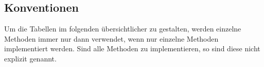 \newcommand{\atable}[3]{\begin{longtable}{llllll}
                            \caption{#2}\label{tab:#1} \\
                            \toprule
                            \textbf{Arbeitspaket} & \textbf{Start} & \textbf{Ende} & \textbf{Aufwand} & \textbf{Bearbeiter:in} & \textbf{Artefakte}
                            \\
                            \midrule
                            \endfirsthead

                            \caption{#2 \emph{(Fortsetzung)}}\\
                            \toprule
                            \textbf{Arbeitspaket} & \textbf{Start} & \textbf{Ende} & \textbf{Aufwand} & \textbf{Bearbeiter:in} & \textbf{Artefakte}
                            \\
                            \midrule
                            \endhead

                            \multicolumn{6}{r}{{Fortsetzung auf der nächsten Seite}}
                            \endfoot

                            \bottomrule
                            \endlastfoot

                            #3
\end{longtable}
}

\newcommand{\aentry}[6]{\footnotesize#1 & \footnotesize#2 & \footnotesize#3 & \footnotesize#4 & \footnotesize#5 & \footnotesize\makecell{#6}\\\midrule}

\renewcommand{\cellalign}{cl}


\subsection{Konventionen}
Um die Tabellen im folgenden übersichtlicher zu gestalten, werden einzelne Methoden immer nur dann verwendet, wenn nur einzelne Methoden implementiert werden. Sind alle Methoden zu implementieren, so sind diese nicht explizit genannt.

